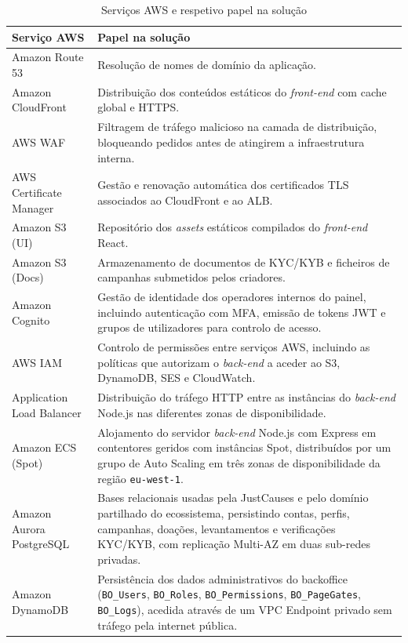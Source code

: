\begin{table}[H]
\caption{Serviços AWS e respetivo papel na solução}
\label{tab:aws_servicos}
\begin{center}
\footnotesize
\begin{tabular}{|l|p{9cm}|}
\hline
Serviço AWS & Papel na solução \\ \hline
Amazon Route 53       & Resolução de nomes de domínio da aplicação. \\ \hline
Amazon CloudFront     & Distribuição dos conteúdos estáticos do \textit{front-end} com cache global e HTTPS. \\ \hline
AWS WAF               & Filtragem de tráfego malicioso na camada de distribuição, bloqueando pedidos antes de atingirem a infraestrutura interna. \\ \hline
AWS Certificate Manager & Gestão e renovação automática dos certificados TLS associados ao CloudFront e ao ALB. \\ \hline
Amazon S3 (UI)        & Repositório dos \textit{assets} estáticos compilados do \textit{front-end} React. \\ \hline
Amazon S3 (Docs)      & Armazenamento de documentos de \gls{KYC}/\gls{KYB} e ficheiros de campanhas submetidos pelos criadores. \\ \hline
Amazon Cognito        & Gestão de identidade dos operadores internos do painel, incluindo autenticação com MFA, emissão de tokens JWT e grupos de utilizadores para controlo de acesso. \\ \hline
AWS IAM               & Controlo de permissões entre serviços AWS, incluindo as políticas que autorizam o \textit{back-end} a aceder ao S3, DynamoDB, SES e CloudWatch. \\ \hline
Application Load Balancer & Distribuição do tráfego \gls{HTTP} entre as instâncias do \textit{back-end} Node.js nas diferentes zonas de disponibilidade. \\ \hline
Amazon ECS (Spot)     & Alojamento do servidor \textit{back-end} Node.js com Express em contentores geridos com instâncias Spot, distribuídos por um grupo de Auto Scaling em três zonas de disponibilidade da região \texttt{eu-west-1}. \\ \hline
Amazon Aurora PostgreSQL & Bases relacionais usadas pela JustCauses e pelo domínio partilhado do ecossistema, persistindo contas, perfis, campanhas, doações, levantamentos e verificações \gls{KYC}/\gls{KYB}, com replicação Multi-AZ em duas sub-redes privadas. \\ \hline
Amazon DynamoDB       & Persistência dos dados administrativos do backoffice (\texttt{BO\_Users}, \texttt{BO\_Roles}, \texttt{BO\_Permissions}, \texttt{BO\_PageGates}, \texttt{BO\_Logs}), acedida através de um VPC Endpoint privado sem tráfego pela internet pública. \\ \hline

\end{tabular}
\end{center}
\end{table}
